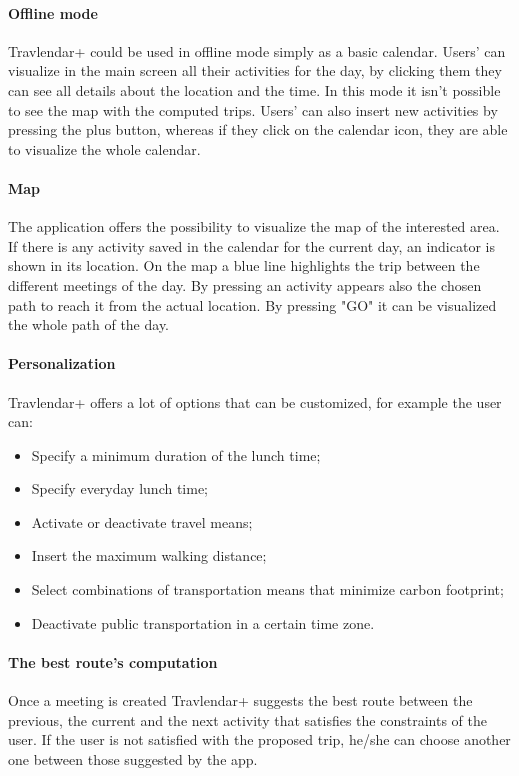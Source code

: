 \documentclass[12pt,titlepage]{article}
\begin{document}
\paragraph{Offline mode}
Travlendar+ could be used in offline mode simply as a basic calendar. Users' can visualize in the main screen all their activities for the day, by clicking them they can see all details about the location and the time. In this mode it isn't possible to see the map with the computed trips. Users' can also insert new activities by pressing the plus button, whereas if they click on the calendar icon, they are able to visualize the whole calendar. 

\paragraph{Map}
The application offers the possibility to visualize the map of the interested area. If there is any activity saved in the calendar for the current day, an indicator is shown in its location. On the map a blue line highlights the trip between the different meetings of the day. By pressing an activity appears also the chosen path to reach it from the actual location. By pressing "GO" it can be visualized the whole path of the day.

\paragraph{Personalization}
Travlendar+ offers a lot of options that can be customized, for example the user can:
\begin{itemize}
\item{Specify a minimum duration of the lunch time;}
\item {Specify everyday lunch time;}
\item{Activate or deactivate travel means;}
\item{Insert the maximum walking distance;}
\item{Select combinations of transportation means that minimize carbon footprint;}
\item{Deactivate public transportation in a certain time zone.}
\end{itemize}

\paragraph{The best route's computation}
Once a meeting is created Travlendar+ suggests the best route between the previous, the current and the next activity that satisfies the constraints of the user. If the user is not satisfied with the proposed trip, he/she can choose another one between those suggested by the app.
\end{document}

